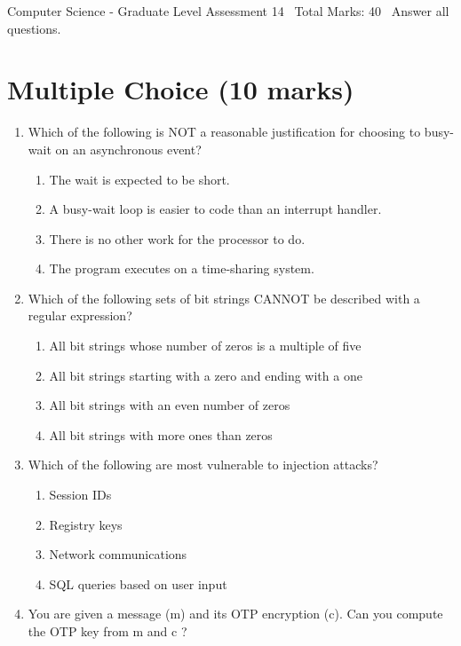 \documentclass[12pt]{article}
\begin{document}
\begin{center}
Computer Science - Graduate Level Assessment 14 \
Total Marks: 40 \
Answer all questions.
\end{center}

\section*{Multiple Choice (10 marks)}
\begin{enumerate}[label=\arabic*.]
\item Which of the following is NOT a reasonable justification for choosing to busy-wait on an asynchronous event?
\begin{enumerate}[label=(\alph*)]
    \item The wait is expected to be short.
    \item A busy-wait loop is easier to code than an interrupt handler.
    \item There is no other work for the processor to do.
    \item The program executes on a time-sharing system.
\end{enumerate}
\item Which of the following sets of bit strings CANNOT be described with a regular expression?
\begin{enumerate}[label=(\alph*)]
    \item All bit strings whose number of zeros is a multiple of five
    \item All bit strings starting with a zero and ending with a one
    \item All bit strings with an even number of zeros
    \item All bit strings with more ones than zeros
\end{enumerate}
\item Which of the following are most vulnerable to injection attacks?
\begin{enumerate}[label=(\alph*)]
    \item Session IDs
    \item Registry keys
    \item Network communications
    \item SQL queries based on user input
\end{enumerate}
\item You are given a message (m) and its OTP encryption (c). Can you compute the OTP key from m and c ?
\begin{enumerate}[label=(\alph*)]

\end{enumerate}
\end{enumerate}
\end{document}
